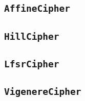 
\subsection{\texttt{AffineCipher}}
\subsection{\texttt{HillCipher}}
\subsection{\texttt{LfsrCipher}}
\subsection{\texttt{VigenereCipher}}
